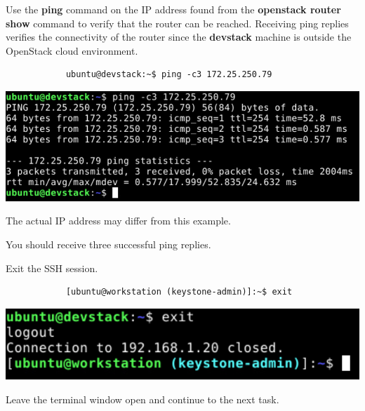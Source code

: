 \documentclass[letterpaper, 12pt]{article}
\begin{document}
\begin{enumerate}
    \begin{labstep}
        Use the \textbf{ping} command on the IP address found from the \textbf{openstack router show} command to verify that the router can be reached.
        Receiving ping replies verifies the connectivity of the router since the \textbf{devstack} machine is outside the OpenStack cloud environment.
        \begin{lstlisting}
            ubuntu@devstack:~$ ping -c3 172.25.250.79
        \end{lstlisting}

        \begin{center}
            \includegraphics[width=\linewidth]{images/part2/step17.png}
        \end{center}
    \end{labstep}

    \begin{notebox}
        The actual IP address may differ from this example.
    \end{notebox}
    \begin{notebox}
        You should receive three successful ping replies.
    \end{notebox}

    \begin{labstep}
        Exit the SSH session.
        \begin{lstlisting}
            [ubuntu@workstation (keystone-admin)]:~$ exit
        \end{lstlisting}

        \begin{center}
            \includegraphics[width=\linewidth]{images/part2/step18.png}
        \end{center}
    \end{labstep}

    \begin{labstep}
        Leave the terminal window open and continue to the next task.
    \end{labstep}

\end{enumerate}
\end{document}
